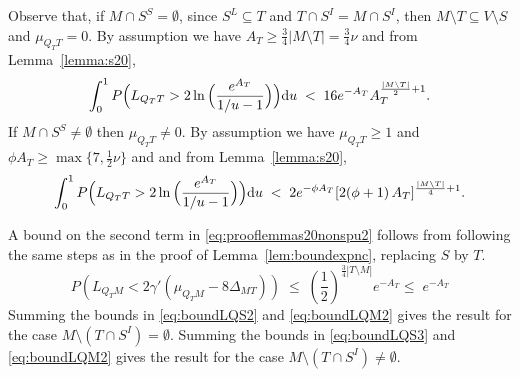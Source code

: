 \documentclass[aos]{imsart}
\theoremstyle{plain}
\begin{document}
\begin{supplement}
Observe that, if $M\cap S^S=\emptyset$, since $S^L\subseteq T$ and $T\cap S^I=M\cap S^I$, then $M\setminus T \subseteq V\setminus S$ and $\mu_{Q_TT}=0$. By assumption we have $A_T \geq \tfrac34|M\setminus T|=\tfrac34\nu$ and from Lemma~\ref{lemma:s20},
\begin{equation}\label{eq:boundLQS2}
\int_0^1P\Bigl(L_{Q_TT}>2\ln{\Bigl(\frac{e^{A_T}}{1 / u-1}\Bigl)}\Bigl){\rm d}u \;<\; 16
e^{-A_T}A_T^{\frac{|M\setminus T|}{2}+1}.
\end{equation}
If $M\cap S^S\neq\emptyset$ then $\mu_{Q_TT}\neq 0$. By assumption we have $\mu_{Q_TT}\geq 1$ and $\phi A_T \geq \max\{7,\tfrac12\nu\}$ and and from Lemma~\ref{lemma:s20},
\begin{equation}\label{eq:boundLQS3}
\int_0^1P\Bigl(L_{Q_TT}>2\ln{\Bigl(\frac{e^{A_T}}{1 / u-1}\Bigl)}\Bigl){\rm d}u \;<\; 2
e^{-\phi A_T}[2(\phi+1)\,A_T]^{\frac{|M\setminus T|}{4}+1}.
\end{equation}

A bound on the second term in \eqref{eq:prooflemmas20nonspu2} follows from following the same steps as in the proof of Lemma~\ref{lem:boundexpnc}, replacing $S$ by $T$. 
\begin{equation}\label{eq:boundLQM2}
    P\left(L_{Q_TM}<2\gamma'(\mu_{Q_TM}-8\Delta_{MT})\right) \;\leq\; \left(\frac12\right)^{\tfrac34|T\setminus M|}e^{-A_T}\leq\;e^{-A_T}
\end{equation}
Summing the bounds in \eqref{eq:boundLQS2} and \eqref{eq:boundLQM2} gives the result for the case $M\setminus (T\cap S^I)=\emptyset$. Summing the bounds in \eqref{eq:boundLQS3} and \eqref{eq:boundLQM2} gives the result for the case $M\setminus (T\cap S^I)\neq\emptyset$.



\end{supplement}
\end{document}
